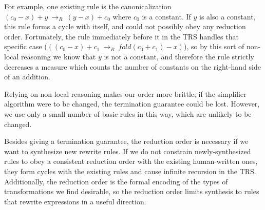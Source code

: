 \documentclass[acmsmall,review,anonymous]{acmart}\settopmatter{printfolios=true,printccs=false,printacmref=false}
\newcommand{\rewrites}[0]{\:\rightarrow_{R}\:}
\begin{document}
For example, one existing rule is the canonicalization $(c_0 - x) + y \rewrites (y - x) + c_0$ where $c_0$ is a constant. If $y$ is also a constant, this rule forms a cycle with itself, and could not possibly obey any reduction order. Fortunately, the rule immediately before it in the TRS handles that specific case ($((c_0 - x) + c_1 \rewrites fold(c_0 + c_1) - x)$), so by this sort of non-local reasoning we know that $y$ is not a constant, and therefore the rule strictly decreases a measure which counts the number of constants on the right-hand side of an addition.





Relying on non-local reasoning makes our order more brittle; if the simplifier algorithm were to be changed, the termination guarantee could be lost. However, we use only a small number of basic rules in this way, which are unlikely to be changed.

Besides giving a termination guarantee, the reduction order is necessary if we want to synthesize new rewrite rules. If we do not constrain newly-synthesized rules to obey a consistent reduction order with the existing human-written ones, they form cycles with the existing rules and cause infinite recursion in the TRS. Additionally, the reduction order is the formal encoding of the types of transformations we find desirable, so the reduction order limits synthesis to rules that rewrite expressions in a useful direction.
\end{document}
